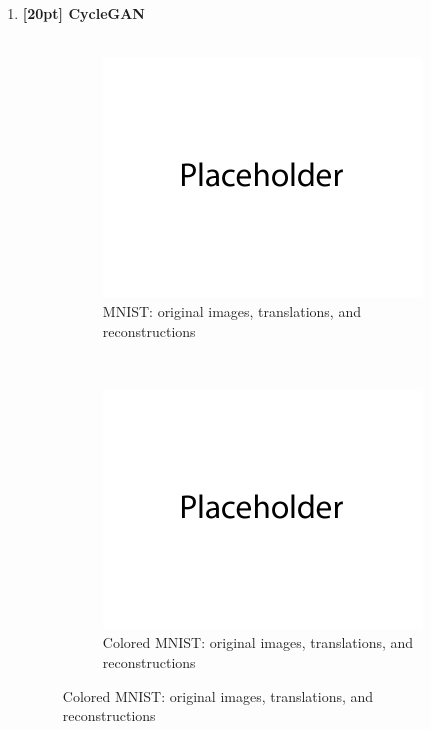 \documentclass{article}
\begin{document}
\newpage
{}
\begin{enumerate}

\item {\bf [20pt] CycleGAN} \\\\
\begin{figure}[H]
    \centering
    \begin{subfigure}{0.5\textwidth}
        \centering
        \includegraphics[width=\textwidth]{figures/q4_mnist.png}
        \caption{MNIST: original images, translations, and reconstructions}
    \end{subfigure}
    \\
    \begin{subfigure}{0.5\textwidth}
        \centering
        \includegraphics[width=\textwidth]{figures/q4_colored_mnist.png}
        \caption{Colored MNIST: original images, translations, and reconstructions}
    \end{subfigure}
\end{figure}
\end{enumerate}
\end{document}
